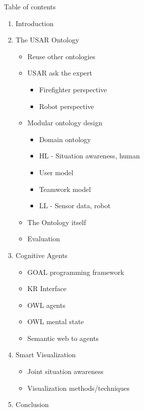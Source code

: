 Table of contents
\tableofcontents{}

\begin{enumerate}
\item Introduction
\item The USAR Ontology
\begin{itemize}
\item Reuse other ontologies
\item USAR ask the expert 
\begin{itemize}
\item Firefighter perspective
\item Robot perspective
\end{itemize}
\item Modular ontology design
\begin{itemize}
\item Domain ontology
\item HL - Situation awareness, human 
\item User model
\item Teamwork model
\item LL - Sensor data, robot
\end{itemize}
\item The Ontology itself
\item Evaluation
\end{itemize}

\item Cognitive Agents
\begin{itemize}
\item GOAL programming framework
\item KR Interface
\item OWL agents
\item OWL mental state
\item Semantic web to agents
\end{itemize}

\item Smart Visualization
\begin{itemize}
\item Joint situation awareness
\item Visualization methods/techniques
\end{itemize}
\item Conclusion
\end{enumerate}
    